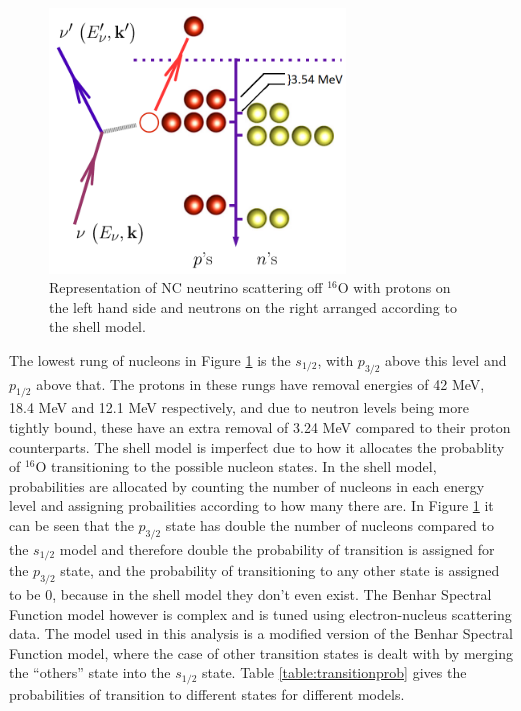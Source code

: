 \begin{figure}
    \centering
    \includegraphics[width=0.7\textwidth]{Figures/ncqebenharspectral.png}
    \caption{Representation of NC neutrino scattering off ${ }^{16} \mathrm{O}$ with protons on the left hand side and neutrons on the right arranged according to the shell model. }
\label{fig:ncqebenharspectral}
\end{figure}

The lowest rung of nucleons in Figure \ref{fig:ncqebenharspectral} is the $s_{1/2}$, with $p_{3/2}$ above this level and $p_{1/2}$ above that. The protons in these rungs have removal energies of 42 MeV, 18.4 MeV and 12.1 MeV respectively, and due to neutron levels being more tightly bound, these have an extra removal of 3.24 MeV compared to their proton counterparts. The shell model is imperfect due to how it allocates the probablity of ${ }^{16} \mathrm{O}$ transitioning to the possible nucleon states. In the shell model, probabilities are allocated by counting the number of nucleons in each energy level and assigning probailities according to how many there are. In Figure \ref{fig:ncqebenharspectral} it can be seen that the $p_{3/2}$ state has double the number of nucleons compared to the $s_{1/2}$ model and therefore double the probability of transition is assigned for the $p_{3/2}$ state, and the probability of transitioning to any other state is assigned to be 0, because in the shell model they don't even exist. The Benhar Spectral Function model however is complex and is tuned using electron-nucleus scattering data. The model used in this analysis is a modified version of the Benhar Spectral Function model, where the case of other transition states is dealt with by merging the ``others'' state into the $s_{1/2}$ state. Table \ref{table:transitionprob} gives the probabilities of transition to different states for different models. 

